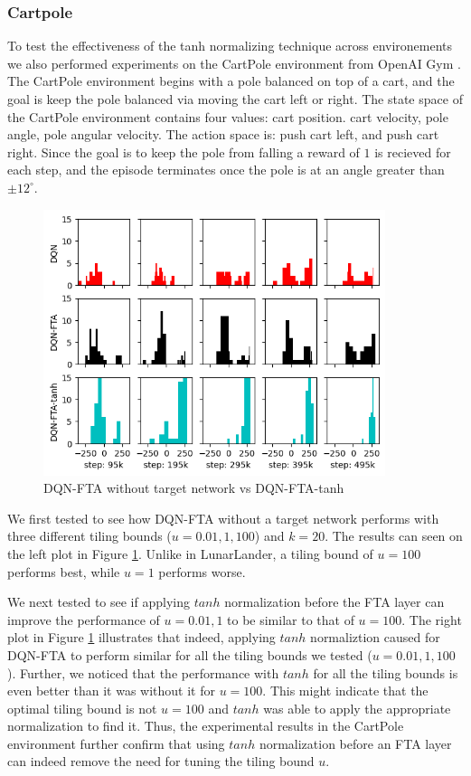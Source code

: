 \documentclass{article}
\begin{document}
\subsubsection{Cartpole}
To test the effectiveness of the tanh normalizing technique across environements we also performed experiments on the CartPole environment from OpenAI Gym \cite{brockman2016gym}.
The CartPole environment begins with a pole balanced on top of a cart, and the goal is keep the pole balanced via moving the cart left or right.
The state space of the CartPole environment contains four values: cart position. cart velocity, pole angle, pole angular velocity. 
The action space is: push cart left, and push cart right.
Since the goal is to keep the pole from falling a reward of $1$ is recieved for each step, and the episode terminates once the pole is at an angle greater than $\pm 12^\circ$.

\begin{figure}[h]
    \centering
    \includegraphics[width=10cm]{distribution.png}
    \caption{DQN-FTA without target network vs DQN-FTA-tanh}
    \label{fig:cartpole}
\end{figure}


We first tested to see how DQN-FTA without a target network performs with three different tiling bounds ($u=0.01, 1, 100$) and $k=20$.
The results can seen on the left plot in Figure \ref{fig:cartpole}. 
Unlike in LunarLander, a tiling bound of $u=100$ performs best, while $u=1$ performs worse.

We next tested to see if applying $tanh$ normalization before the FTA layer can improve the performance of $u=0.01, 1$ to be similar to that of $u=100$.
The right plot in Figure \ref{fig:cartpole} illustrates that indeed, applying $tanh$ normaliztion caused for DQN-FTA to perform similar for all the tiling bounds we tested ($u=0.01, 1, 100$).
Further, we noticed that the performance with $tanh$ for all the tiling bounds is even better than it was without it for $u=100$.
This might indicate that the optimal tiling bound is not $u=100$ and $tanh$ was able to apply the appropriate normalization to find it.
Thus, the experimental results in the CartPole environment further confirm that using $tanh$ normalization before an FTA layer can indeed remove the need for tuning the tiling bound $u$.
\end{document}
